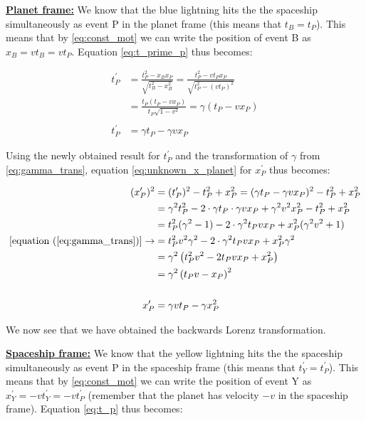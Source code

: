 \documentclass[a4paper,10pt,english]{article}
\begin{document}
\begin{enumerate}
\underline{\bf{Planet frame:}} We know that the blue lightning hits the the spaceship simultaneously as event P in the planet frame (this means that $t_{B}=t_{P}$). This means that by \ref{eq:const_mot} we can write the position of event B as $x_{B}=vt_{B}=vt_{P}$. Equation \ref{eq:t_prime_p} thus becomes: 

\begin{align*}
t^{\prime}_{P}&=\frac{t_{P}^{2}-x_{B}x_{P}}{\sqrt{t_{B}^2-x_{B}^2}}=\frac{t_{P}^{2}-vt_{P}x_{P}}{\sqrt{t_{P}^2-(vt_{P})^2}}\\
&=\frac{t_{P}(t_{P}-vx_{P})}{t_{P}\sqrt{1-v^2}}=\gamma(t_{P}-vx_{P})\\
\\
t^{\prime}_{P}&=\gamma t_{P}-\gamma vx_{P}
\end{align*}

Using the newly obtained result for $t^{\prime}_{P}$ and the transformation of $\gamma$ from \ref{eq:gamma_trans}, equation \ref{eq:unknown_x_planet} for $x^{\prime}_{P}$ thus becomes:

\begin{align*}
(x^{\prime}_{P})^{2}&=(t^{\prime}_{P})^{2}-t_{P}^{2}+x_{P}^{2}=(\gamma t_{P}-\gamma vx_{P})^{2}-t_{P}^{2}+x_{P}^{2}\\
&=\gamma^{2}t_{P}^{2}-2\cdot\gamma t_{P}\cdot\gamma vx_{P}+\gamma^{2}v^{2}x_{P}^{2}-t_{P}^{2}+x_{P}^{2}\\
&=t_{P}^{2}(\gamma^{2}-1)-2\cdot\gamma^{2} t_{P}vx_{P}+x_{P}^{2}(\gamma^{2}v^{2}+1)\\
[\text{equation }(\ref{eq:gamma_trans})]\rightarrow&=t_{P}^{2}v^{2}\gamma^{2}-2\cdot\gamma^{2} t_{P}vx_{P}+x_{P}^{2}\gamma^{2}\\
&=\gamma^{2}\left(t_{P}^{2}v^{2}-2t_{P}vx_{P}+x_{P}^{2}\right)\\
&=\gamma^{2}\left(t_{P}v-x_{P}\right)^{2}\\
\\
x^{\prime}_{P}&=\gamma vt_{P}-\gamma x_{P}^{2}
\end{align*}

We now see that we have obtained the backwards Lorenz transformation.

\underline{\bf{Spaceship frame:}} We know that the yellow lightning hits the the spaceship simultaneously as event P in the spaceship frame (this means that $t_{Y}^{\prime}=t_{P}^{\prime}$). This means that by \ref{eq:const_mot} we can write the position of event Y as $x_{Y}^{\prime}=-vt_{Y}^{\prime}=-vt_{P}^{\prime}$ (remember that the planet has velocity $-v$ in the spaceship frame). Equation \ref{eq:t_p} thus becomes: 


\end{enumerate}
\end{document}
